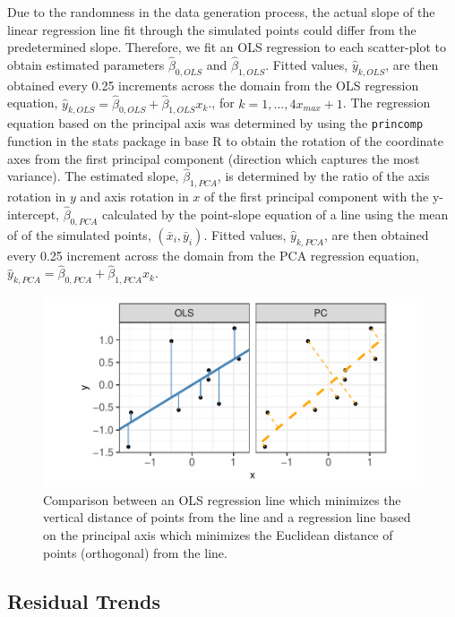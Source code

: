\documentclass[12pt]{article}
\begin{document}
Due to the randomness in the data generation process, the actual slope
of the linear regression line fit through the simulated points could
differ from the predetermined slope. Therefore, we fit an OLS regression
to each scatter-plot to obtain estimated parameters
\(\hat\beta_{0,OLS}\) and \(\hat\beta_{1,OLS}\). Fitted values,
\(\hat y_{k,OLS}\), are then obtained every 0.25 increments across the
domain from the OLS regression equation,
\(\hat y_{k,OLS} = \hat\beta_{0,OLS} + \hat\beta_{1,OLS} x_k\)., for
\(k = 1, ..., 4 x_{max} +1\). The regression equation based on the
principal axis was determined by using the \texttt{princomp} function in
the stats package in base R to obtain the rotation of the coordinate
axes from the first principal component (direction which captures the
most variance). The estimated slope, \(\hat\beta_{1,PCA}\), is
determined by the ratio of the axis rotation in \(y\) and axis rotation
in \(x\) of the first principal component with the y-intercept,
\(\hat\beta_{0,PCA}\) calculated by the point-slope equation of a line
using the mean of of the simulated points, \((\bar x_i, \bar y_i)\).
Fitted values, \(\hat y_{k,PCA}\), are then obtained every 0.25
increment across the domain from the PCA regression equation,
\(\hat y_{k,PCA} = \hat\beta_{0,PCA} + \hat\beta_{1,PCA} x_k\).

\begin{figure}[tbp]

{\centering \includegraphics[width=0.8\linewidth,]{Eye-Fitting-Straight-Lines-in-the-Modern-Era_files/figure-latex/ols-vs-pca-example-1} 

}

\caption{ Comparison between an OLS regression line which minimizes the vertical distance of points from the line and a regression line based on the principal axis which minimizes the Euclidean distance of points (orthogonal) from the line.}\label{fig:ols-vs-pca-example}
\end{figure}

\hypertarget{residual-trends}{%
\subsection{Residual Trends}\label{residual-trends}}
\end{document}
